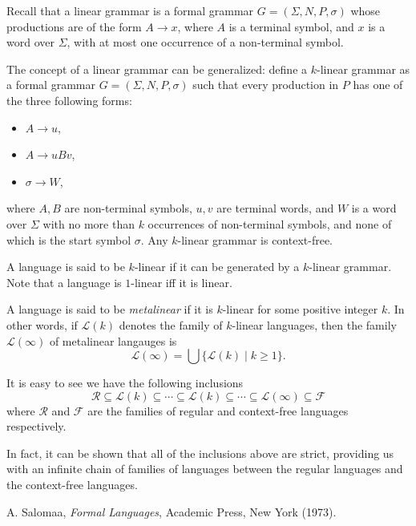 \documentclass[12pt]{article}
\begin{document}
Recall that a linear grammar is a formal grammar $G=(\Sigma, N,P,\sigma)$ whose productions are of the form $A\to x$, where $A$ is a terminal symbol, and $x$ is a word over $\Sigma$, with at most one occurrence of a non-terminal symbol.

The concept of a linear grammar can be generalized: define a $k$-linear grammar as a formal grammar $G=(\Sigma, N,P,\sigma)$ such that every production in $P$ has one of the three following forms:
\begin{itemize}
\item $A\to u$,
\item $A\to uBv$,
\item $\sigma \to W$,
\end{itemize}
where $A,B$ are non-terminal symbols, $u,v$ are terminal words, and $W$ is a word over $\Sigma$ with no more than $k$ occurrences of non-terminal symbols, and none of which is the start symbol $\sigma$.  Any $k$-linear grammar is context-free.

A language is said to be $k$-linear if it can be generated by a $k$-linear grammar.  Note that a language is $1$-linear iff it is linear.

A language is said to be \emph{metalinear} if it is $k$-linear for some positive integer $k$.  In other words, if $\mathscr{L}(k)$ denotes the family of $k$-linear languages, then the family $\mathscr{L}(\infty)$ of metalinear langauges is $$\mathscr{L}(\infty)=\bigcup \lbrace \mathscr{L}(k) \mid k\ge 1\rbrace.$$

It is easy to see we have the following inclusions
$$\mathscr{R}\subseteq \mathscr{L}(k) \subseteq \cdots \subseteq \mathscr{L}(k) \subseteq \cdots \subseteq \mathscr{L}(\infty) \subseteq \mathscr{F}$$
where $\mathscr{R}$ and $\mathscr{F}$ are the families of regular and context-free languages respectively.

In fact, it can be shown that all of the inclusions above are strict, providing us with an infinite chain of families of languages between the regular languages and the context-free languages.

\begin{thebibliography}{9}
 A. Salomaa, {\em Formal Languages}, Academic Press, New York (1973).
\end{thebibliography}
\end{document}

